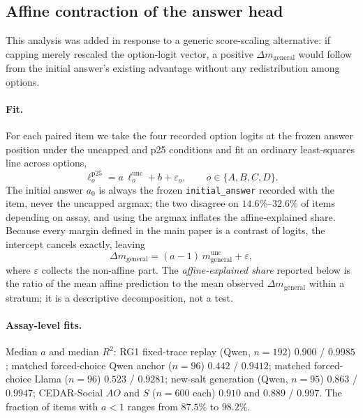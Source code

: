\documentclass[letterpaper]{article}
\begin{document}
\subsection{Affine contraction of the answer head}
\label{supp:contraction}

This analysis was added in response to a generic score-scaling alternative: if capping merely rescaled the option-logit vector, a positive $\Delta m_{\mathrm{general}}$ would follow from the initial answer's existing advantage without any redistribution among options.

\paragraph{Fit.}
For each paired item we take the four recorded option logits at the frozen answer position under the uncapped and p25 conditions and fit an ordinary least-squares line across options,
\begin{equation}
\ell^{\mathrm{p25}}_{o}=a\,\ell^{\mathrm{unc}}_{o}+b+\varepsilon_{o},\qquad o\in\{A,B,C,D\}.
\end{equation}
The initial answer $a_0$ is always the frozen \texttt{initial\_answer} recorded with the item, never the uncapped argmax; the two disagree on $14.6\%$--$32.6\%$ of items depending on assay, and using the argmax inflates the affine-explained share. Because every margin defined in the main paper is a contrast of logits, the intercept cancels exactly, leaving
\begin{equation}
\Delta m_{\mathrm{general}}=(a-1)\,m^{\mathrm{unc}}_{\mathrm{general}}+\varepsilon,
\end{equation}
where $\varepsilon$ collects the non-affine part. The \emph{affine-explained share} reported below is the ratio of the mean affine prediction to the mean observed $\Delta m_{\mathrm{general}}$ within a stratum; it is a descriptive decomposition, not a test.

\paragraph{Assay-level fits.}
Median $a$ and median $R^{2}$: RG1 fixed-trace replay (Qwen, $n=192$) $0.900$ / $0.9985$; matched forced-choice Qwen anchor ($n=96$) $0.442$ / $0.9412$; matched forced-choice Llama ($n=96$) $0.523$ / $0.9281$; new-salt generation (Qwen, $n=95$) $0.863$ / $0.9947$; CEDAR-Social $AO$ and $S$ ($n=600$ each) $0.910$ and $0.889$ / $0.997$. The fraction of items with $a<1$ ranges from $87.5\%$ to $98.2\%$.
\end{document}
